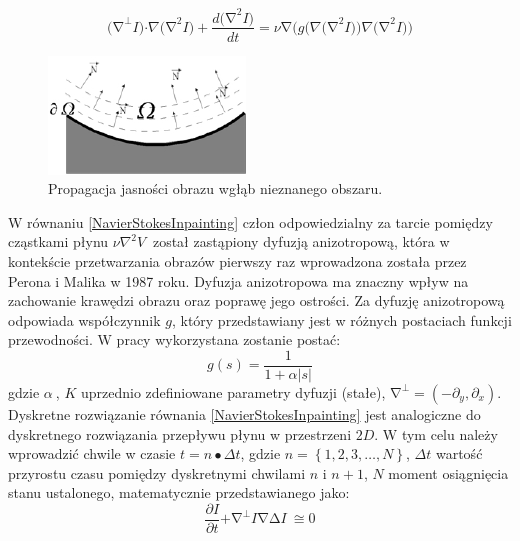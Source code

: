 \documentclass[12pt, twoside, openany]{report}
\theoremstyle{definition}
\begin{document}
\begin{equation}
{\mathrm{(}\mathrm{\nabla }}^{\mathrm{\bot }}I\mathrm{)}\mathrm{\cdot }\nabla {\mathrm{(}\mathrm{\nabla }}^{\mathrm{2}}I\mathrm{)+}\frac{d{\mathrm{(}\mathrm{\nabla }}^{\mathrm{2}}I\mathrm{)}}{dt}\mathrm{=}\nu \mathrm{\nabla }\mathrm{(}g\mathrm{(}\nabla {\mathrm{(}\mathrm{\nabla }}^{\mathrm{2}}I\mathrm{))}\nabla {\mathrm{(}\mathrm{\nabla }}^{\mathrm{2}}I\mathrm{))} 
\label{NavierStokesInpainting}
\end{equation}
\begin{figure}[!h]
	\centering
	\includegraphics[scale=1]{rysunki/3_fig1}
	\caption{Propagacja jasności obrazu wgłąb nieznanego obszaru.}
	\label{3_fig1}
\end{figure}
W równaniu \eqref{NavierStokesInpainting} człon odpowiedzialny za tarcie pomiędzy cząstkami płynu $\nu {\nabla }^2V\ $ został zastąpiony dyfuzją anizotropową, która w kontekście przetwarzania obrazów pierwszy raz wprowadzona została przez Perona i Malika w 1987 roku. Dyfuzja anizotropowa ma znaczny wpływ na zachowanie krawędzi obrazu oraz poprawę jego ostrości. Za dyfuzję anizotropową odpowiada współczynnik $g$, który przedstawiany jest w różnych postaciach funkcji przewodności. W pracy wykorzystana zostanie postać:
\begin{equation}
g\left(s\right)=\frac{1}{1+\alpha \left|s\right|}
\end{equation}
gdzie $\alpha\ $, $K$ uprzednio zdefiniowane parametry dyfuzji (stałe), ${\mathrm{\nabla }}^{\bot }=({-\partial }_y,{\partial }_x)$. 
Dyskretne rozwiązanie równania \eqref{NavierStokesInpainting} jest analogiczne do dyskretnego rozwiązania przepływu płynu w przestrzeni $2D$. W tym celu należy wprowadzić chwile w czasie $t=n\bullet \Delta t$, gdzie $n=\left\{1,2,3,\dots ,N\right\}$, $\Delta t$ wartość przyrostu czasu pomiędzy dyskretnymi chwilami $n$ i $n+1$, $N$ moment osiągnięcia stanu ustalonego, matematycznie przedstawianego jako:
\begin{equation}
\frac{\partial I}{\partial t}\mathrm{+}{\mathrm{\nabla }}^{\mathrm{\bot }}I\mathrm{\nabla }\mathrm{\Delta }I\mathrm{\ }\mathrm{\cong }\mathrm{0}
\label{NavierStokesStability}
\end{equation}
\end{document}

